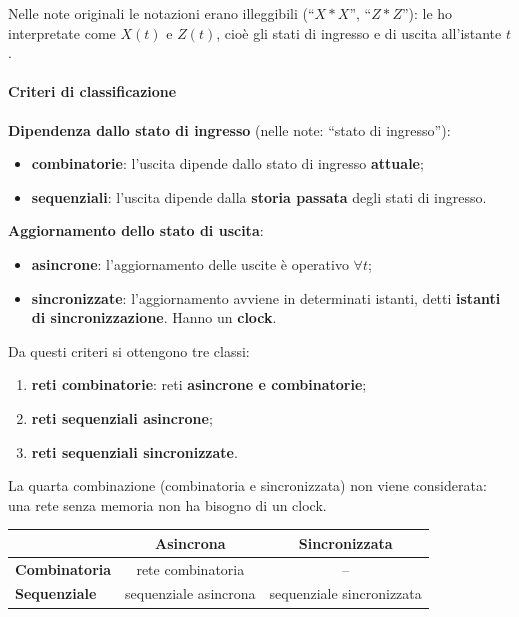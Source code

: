 \documentclass[11pt,a4paper]{article}
\begin{document}
\begin{integrazione}
Nelle note originali le notazioni erano illeggibili (``$X * X$'', ``$Z * Z$''): le ho interpretate come $X(t)$ e $Z(t)$, cioè gli stati di ingresso e di uscita all'istante $t$.
\end{integrazione}

\paragraph*{Criteri di classificazione}

\textbf{Dipendenza dallo stato di ingresso} (nelle note: ``stato di ingresso''):
\begin{itemize}[leftmargin=*]
  \item \textbf{combinatorie}: l'uscita dipende dallo stato di ingresso \textbf{attuale};
  \item \textbf{sequenziali}: l'uscita dipende dalla \textbf{storia passata} degli stati di ingresso.
\end{itemize}

\textbf{Aggiornamento dello stato di uscita}:
\begin{itemize}[leftmargin=*]
  \item \textbf{asincrone}: l'aggiornamento delle uscite è operativo $\forall t$;
  \item \textbf{sincronizzate}: l'aggiornamento avviene in determinati istanti, detti \textbf{istanti di sincronizzazione}. Hanno un \textbf{clock}.
\end{itemize}

Da questi criteri si ottengono tre classi:
\begin{enumerate}[leftmargin=*]
  \item \textbf{reti combinatorie}: reti \textbf{asincrone e combinatorie};
  \item \textbf{reti sequenziali asincrone};
  \item \textbf{reti sequenziali sincronizzate}.
\end{enumerate}

\begin{integrazione}
La quarta combinazione (combinatoria e sincronizzata) non viene considerata: una rete senza memoria non ha bisogno di un clock.
\begin{center}
\begin{tabular}{l c c}
 & \textbf{Asincrona} & \textbf{Sincronizzata} \\ \hline
\textbf{Combinatoria} & rete combinatoria & -- \\
\textbf{Sequenziale} & sequenziale asincrona & sequenziale sincronizzata \\
\end{tabular}
\end{center}
\end{integrazione}
\end{document}
